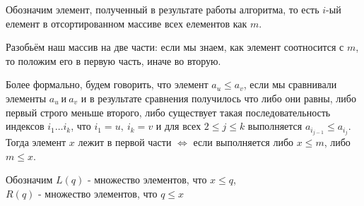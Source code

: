 \documentclass[12pt]{article}
\begin{document}
	\large
		Обозначим элемент, полученный в результате работы алгоритма, 
	то есть $i$-ый елемент в отсортированном массиве всех елементов как $m$.
		\par
		Разобьём наш массив на две части: 
	если мы знаем, как элемент соотносится с $m$, 
	то положим его в первую часть, иначе во вторую.
		\par
		Более формально, будем говорить, что элемент $a_u \le a_v$, если мы сравнивали элементы $a_u\ и\ a_v$ и в результате сравнения 	получилось что либо они равны, либо первый строго меньше второго, либо существует такая последовательность индексов $i_1 \dots i_k$, что $i_1 = u,\ i_k = v$ и для всех $2 \le j \le k$ выполняется $a_{i_{j-1}} \le a_{i_j}$. Тогда элемент $x$ лежит в первой части $\iff$ если выполняется либо $x \le m$, либо $m \le x$.
		\par
		Обозначим $L(q)$ - множество элементов, что $x \le q$, \\
		$R(q)$ - множество элементов, что $q \le x$
	
\end{document}
